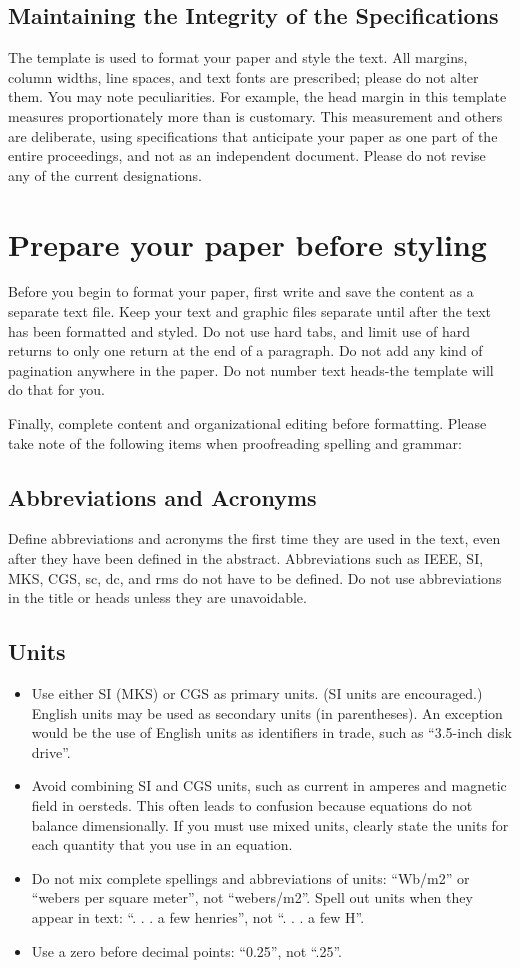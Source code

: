 \documentclass[10pt, conference, a4paper, compsocconf]{IEEEtran}
\begin{document}
\subsection{Maintaining the Integrity of the Specifications}
The template is used to format your paper and style the text. All margins, column widths, line spaces, and text fonts are prescribed; please do not alter them. You may note peculiarities. For example, the head margin in this template measures proportionately more than is customary. This measurement and others are deliberate, using specifications that anticipate your paper as one part of the entire proceedings, and not as an independent document. Please do not revise any of the current designations.

\section{Prepare your paper before styling}
Before you begin to format your paper, first write and save the content as a separate text file. Keep your text and graphic files separate until after the text has been formatted and styled. Do not use hard tabs, and limit use of hard returns to only one return at the end of a paragraph. Do not add any kind of pagination anywhere in the paper. Do not number text heads-the template will do that for you.


Finally, complete content and organizational editing before formatting. Please take note of the following items when proofreading spelling and grammar:
\subsection{Abbreviations and Acronyms}
Define abbreviations and acronyms the first time they are used in the text, even after they have been defined in the abstract. Abbreviations such as IEEE, SI, MKS, CGS, sc, dc, and rms do not have to be defined. Do not use abbreviations in the title or heads unless they are unavoidable.
\subsection{Units}
\begin{itemize}
\item Use either SI (MKS) or CGS as primary units. (SI units are encouraged.) English units may be used as secondary units (in parentheses). An exception would be the use of English units as identifiers in trade, such as “3.5-inch disk drive”.
\item Avoid combining SI and CGS units, such as current in amperes and magnetic field in oersteds. This often leads to confusion because equations do not balance dimensionally. If you must use mixed units, clearly state the units for each quantity that you use in an equation.
\item Do not mix complete spellings and abbreviations of units: “Wb/m2” or “webers per square meter”, not “webers/m2”.  Spell out units when they appear in text: “. . . a few henries”, not “. . . a few H”.
\item Use a zero before decimal points: “0.25”, not “.25”.
\end{itemize}
\end{document}
